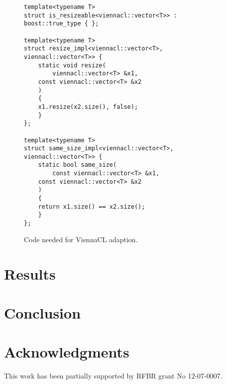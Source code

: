 \documentclass[1p]{elsarticle}
\begin{document}
\begin{figure}
\begin{lstlisting}
template<typename T>
struct is_resizeable<viennacl::vector<T>> : boost::true_type { };

template<typename T>
struct resize_impl<viennacl::vector<T>, viennacl::vector<T>> {
    static void resize(
        viennacl::vector<T> &x1,
	const viennacl::vector<T> &x2
	)
    {
	x1.resize(x2.size(), false);
    }
};

template<typename T>
struct same_size_impl<viennacl::vector<T>, viennacl::vector<T>> {
    static bool same_size(
        const viennacl::vector<T> &x1,
	const viennacl::vector<T> &x2
	)
    {
	return x1.size() == x2.size();
    }
};
\end{lstlisting}
\caption{Code needed for ViennaCL adaption.}
\label{fig:adapt:viennacl}
\end{figure}


\section{Results}

\section{Conclusion}

\section{Acknowledgments}

This work has been partially supported by RFBR grant No 12-07-0007.

\nocite{*}


\end{document}

